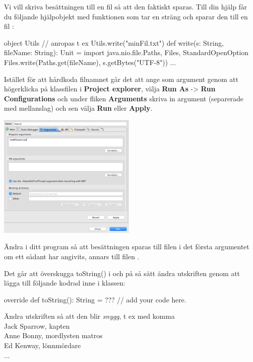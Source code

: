 \Subtask Vi vill skriva besättningen till en fil så att den faktiskt sparas. Till din hjälp får du följande hjälpobjekt  med funktionen  som tar en sträng  och sparar den till en fil :
\begin{CodeSmall}
object Utils{
   // anropas t ex Utils.write("minFil.txt")
  def write(s: String, fileName: String): Unit = {
			import java.nio.file.{Paths, Files, StandardOpenOption}
			Files.write(Paths.get(fileName), s.getBytes("UTF-8"))
  } 
  ...
}
\end{CodeSmall}

Istället för att hårdkoda filnamnet går det att ange som argument genom att högerklicka på klassfilen i {\bf Project explorer}, välja {\bf Run As} -> {\bf Run Configurations} och under fliken {\bf Arguments} skriva in argument (separerade med mellanslag) och sen välja {\bf Run} eller {\bf Apply}. 
\begin{center}
\includegraphics[width=0.5\textwidth]{../img/pirates/args.png} \\
\end{center}

Ändra i ditt program så att besättningen sparas till filen i det första argumentet om ett sådant har angivits, annars till filen .

\Subtask Det går att överskugga toString() i  och på så sätt ändra utskriften genom att lägga till följande kodrad inne i klassen: 
\begin{Code}
override def toString(): String = ??? // add your code here. 
\end{Code}

\noindent Ändra utskriften så att den blir {\em snygg}, t ex med komma\\ 

\noindent Jack Sparrow, kapten \\
Anne Bonny, mordlysten matros \\
Ed Kenway, lönnmördare \\
... 

